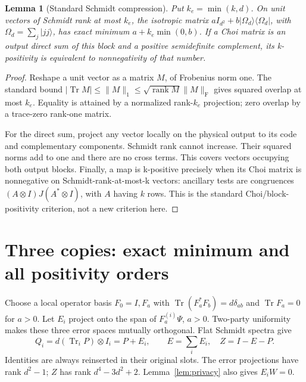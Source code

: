 \documentclass[11pt,a4paper]{article}
\newtheorem{lemma}[theorem]{Lemma}
\newcommand{\Tr}{\operatorname{Tr}}
\newcommand{\F}{\mathrm F}
\DeclareMathOperator{\rank}{rank}
\begin{document}
\begin{lemma}[Standard Schmidt compression]\label{lem:schmidt}
Put \(k_e=\min(k,d)\). On unit vectors of Schmidt rank at most \(k_e\), the isotropic matrix
\(aI_{d^2}+b|\Omega_d\rangle\langle\Omega_d|\), with \(\Omega_d=\sum_j|jj\rangle\), has exact minimum \(a+k_e\min(0,b)\).
If a Choi matrix is an output direct sum of this block and a positive semidefinite complement, its k-positivity is equivalent to nonnegativity of that number.
\end{lemma}
\begin{proof}
Reshape a unit vector as a matrix \(M\), of Frobenius norm one. The standard bound \cite{TH}
\(|\Tr M|\le\|M\|_1\le\sqrt{\rank M}\|M\|_{\F}\)
gives squared overlap at most \(k_e\). Equality is attained by a normalized rank-\(k_e\) projection; zero overlap by a trace-zero rank-one matrix.

For the direct sum, project any vector locally on the physical output to its code and complementary components. Schmidt rank cannot increase. Their squared norms add to one and there are no cross terms. This covers vectors occupying both output blocks. Finally, a map is k-positive precisely when its Choi matrix is nonnegative on Schmidt-rank-at-most-k vectors: ancillary tests are congruences \((A\otimes I)J(A^*\otimes I)\), with \(A\) having \(k\) rows. This is the standard Choi/block-positivity criterion, not a new criterion here.
\end{proof}

\section{Three copies: exact minimum and all positivity orders}
Choose a local operator basis \(F_0=I,F_a\) with \(\Tr(F_a^*F_b)=d\delta_{ab}\) and \(\Tr F_a=0\) for \(a>0\). Let \(E_i\) project onto the span of \(F_a^{(i)}\Psi\), \(a>0\). Two-party uniformity makes these three error spaces mutually orthogonal. Flat Schmidt spectra give
\[
 Q_i=d(\Tr_iP)\otimes I_i=P+E_i,
 \qquad E=\sum_iE_i,\quad Z=I-E-P.
\]
Identities are always reinserted in their original slots. The error projections have rank \(d^2-1\); \(Z\) has rank \(d^4-3d^2+2\). Lemma~\ref{lem:privacy} also gives \(E_iW=0\).
\end{document}
